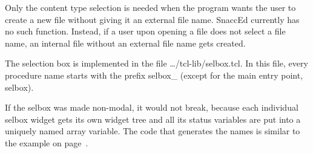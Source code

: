 Only the content type selection is needed when the program wants the user to create a new file without giving it an external file name.
SnaccEd currently has no such function.
Instead, if a user upon opening a file does not select a file name, an internal file without an external file name gets created.

The selection box is implemented in the file {\ufn \dots/tcl-lib/selbox.tcl}.
In this file, every procedure name starts with the prefix {\Tcl selbox\_} (except for the main entry point, {\Tcl selbox}).

If the selbox was made non-modal, it would not break, because each individual selbox widget gets its own widget tree and all its status variables are put into a uniquely named array variable.
The code that generates the names is similar to the example on page~\pageref{tcl-name-space-example-code}.
